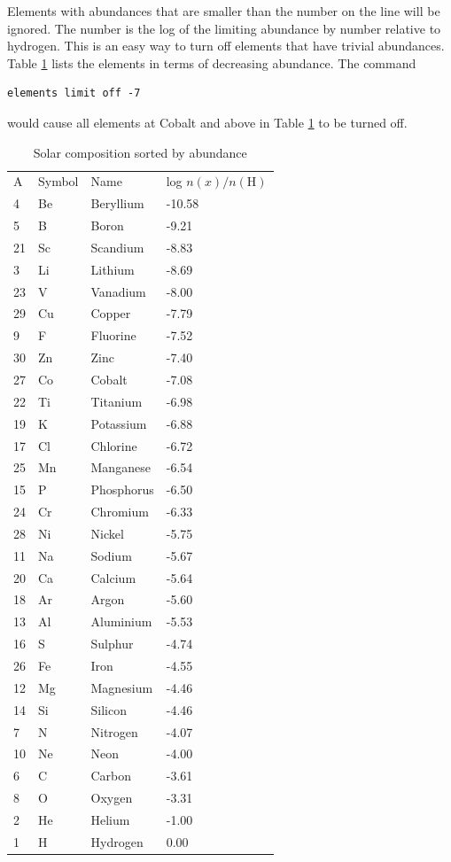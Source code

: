 \noindent Elements with abundances that are
smaller than the number on the line will be ignored.
The number is the log of the limiting abundance by number relative to
hydrogen.
This is an easy way to turn off elements that have trivial
abundances.
Table \ref{tab:CompositionDecreasingOrder} lists the elements
in terms of decreasing abundance.
The command
\begin{verbatim}
elements limit off -7
\end{verbatim}
would cause all elements at Cobalt and above in
Table \ref{tab:CompositionDecreasingOrder} to be turned off.

\begin{table}
\centering
\caption{Solar composition sorted by abundance}
\begin{tabular}{llll}
\hline
\label{tab:CompositionDecreasingOrder}
A& Symbol& Name& log $n(x)/n(\mathrm{H})$\\
4& Be& Beryllium& -10.58\\
5& B& Boron& -9.21\\
21& Sc& Scandium& -8.83\\
3& Li& Lithium& -8.69\\
23& V& Vanadium& -8.00\\
29& Cu& Copper& -7.79\\
9& F& Fluorine& -7.52\\
30& Zn& Zinc& -7.40\\
27& Co& Cobalt& -7.08\\
22& Ti& Titanium& -6.98\\
19& K& Potassium& -6.88\\
17& Cl& Chlorine& -6.72\\
25& Mn& Manganese& -6.54\\
15& P& Phosphorus& -6.50\\
24& Cr& Chromium& -6.33\\
28& Ni& Nickel& -5.75\\
11& Na& Sodium& -5.67\\
20& Ca& Calcium& -5.64\\
18& Ar& Argon& -5.60\\
13& Al& Aluminium& -5.53\\
16& S& Sulphur& -4.74\\
26& Fe& Iron& -4.55\\
12& Mg& Magnesium& -4.46\\
14& Si& Silicon& -4.46\\
7& N& Nitrogen& -4.07\\
10& Ne& Neon& -4.00\\
6& C& Carbon& -3.61\\
8& O& Oxygen& -3.31\\
2& He& Helium& -1.00\\
1& H& Hydrogen& 0.00\\
\hline
\end{tabular}
\end{table}

